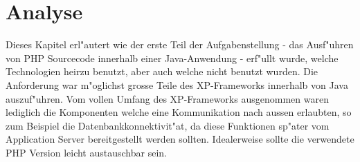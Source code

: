 \section{Analyse}
\label{sec:chap1:ana}
Dieses Kapitel erl"autert wie der erste Teil der Aufgabenstellung - das Ausf"uhren von PHP Sourcecode innerhalb
einer Java-Anwendung - erf"ullt wurde, welche Technologien heirzu benutzt, aber auch welche nicht benutzt wurden.
Die Anforderung war m"oglichst grosse Teile des XP-Frameworks innerhalb von Java auszuf"uhren.
Vom vollen Umfang des XP-Frameworks ausgenommen waren lediglich die Komponenten welche eine Kommunikation
nach aussen erlaubten, so zum Beispiel die Datenbankkonnektivit"at, da diese Funktionen sp"ater vom Application Server
bereitgestellt werden sollten. Idealerweise sollte die verwendete PHP Version leicht austauschbar sein.

